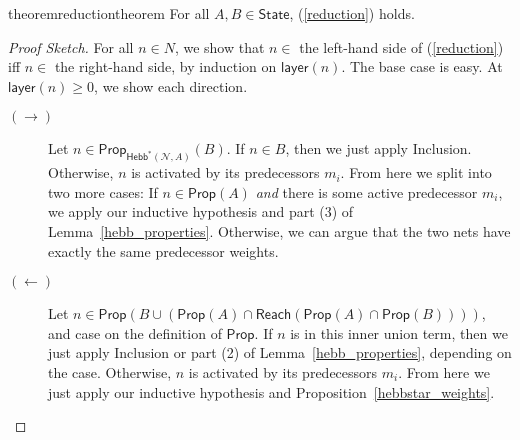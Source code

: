 \documentclass[letterpaper]{article}
\theoremstyle{definition}
\newenvironment{sketch}{\begin{proof}[Proof Sketch]}{\end{proof}}
\newcommand{\State}{\mathsf{State}}
\newcommand{\preds}[1]{\mbox{preds}(#1)}
\newcommand{\layer}[1]{\mathsf{layer}(#1)}
\newcommand{\Net}{\mathcal{N}}
\newcommand{\Prop}{\mathsf{Prop}}
\newcommand{\Reach}{\mathsf{Reach}}
\newcommand{\Hebbstar}[2]{\mathsf{Hebb}^*(#1, #2)}
\begin{document}
\begin{restatable}{theorem}{reductiontheorem}\label{reduction_theorem} 
For all $A, B \in \State$, (\ref{reduction}) holds.
\end{restatable}
\begin{sketch}
    For all $n \in N$, we show that $n \in $ the left-hand side of (\ref{reduction}) iff $n \in $ the right-hand side, by induction on $\layer{n}$.  The base case is easy.  At $\layer{n} \geq 0$, we show each direction.
    \begin{description}
        \item[$(\rightarrow)$] Let $n \in \Prop_{\Hebbstar{\Net}{A}}(B)$.  If $n \in B$, then we just apply Inclusion.  Otherwise, $n$ is activated by its predecessors $m_i$.  From here we split into two more cases: If $n \in \Prop(A)$ \emph{and} there is some active predecessor $m_i$, we apply our inductive hypothesis and part (3) of Lemma~\ref{hebb_properties}.  Otherwise, we can argue that the two nets have exactly the same predecessor weights.

        \item[$(\leftarrow)$] Let $n \in \Prop(B \cup (\Prop(A) \cap \Reach(\Prop(A) \cap \Prop(B))))$, and case on the definition of $\Prop$.  If $n$ is in this inner union term, then we just apply Inclusion or part (2) of Lemma~\ref{hebb_properties}, depending on the case. Otherwise, $n$ is activated by its predecessors $m_i$.  From here we just apply our inductive hypothesis and Proposition~\ref{hebbstar_weights}.\qedhere
    \end{description}
\end{sketch}
\end{document}
